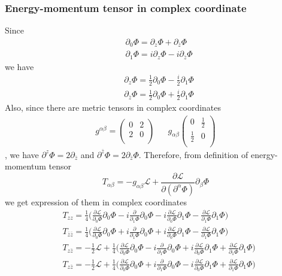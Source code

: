 \documentclass[11pt,a4paper]{article}
\theoremstyle{definition}
\begin{document}
	\subsubsection{Energy-momentum tensor in complex coordinate}
	Since 
	\[
	\begin{aligned}
	&\partial_0 \Phi = \partial_z \Phi + \partial_{\bar{z}}\Phi\\&\partial_1 \Phi = i\partial_z \Phi - i \partial_{\bar{z}}\Phi
	\end{aligned}
	\]
	we have \[
	\begin{aligned}
	&\partial_z \Phi =\frac{1}{2} \partial_0 \Phi - \frac{i}{2} \partial_1 \Phi\\& \partial_{\bar{z}} \Phi = \frac{1}{2} \partial_0 \Phi+ \frac{i}{2} \partial_1 \Phi
	\end{aligned}
	\] 
	Also, since there are metric tensors in complex coordinates
	\[
	\begin{aligned}
	g^{\alpha \beta}= \begin{pmatrix}
	0&2 \\
	2&0\\
	\end{pmatrix}& &g_{\alpha \beta}\begin{pmatrix}
	0& \frac{1}{2}\\
	\frac{1}{2}& 0\\
	\end{pmatrix}
	\end{aligned}
	\],
	we have $\partial^z \Phi = 2 \partial_{\bar{z}}$ and $\partial^{\bar{z}} \Phi = 2\partial_{\bar{z}} \Phi$. Therefore, from definition of energy-momentum tensor
	\[T_{\alpha \beta}= - g_{\alpha \beta} \mathcal{L}+ \frac{\partial \mathcal{L}}{\partial (\partial^\alpha \Phi)} \partial_\beta \Phi
	\] we get expression of them in complex coordinates
	\[
	\begin{aligned}
	&T_{zz} = \frac{1}{4}\big( \frac{\partial \mathcal{L}}{\partial_0 \Phi} \partial_0 \Phi - i \frac{\partial}{\partial_1 \Phi} \partial_0 \Phi - i \frac{\partial \mathcal{L}}{\partial_0 \Phi} \partial_1 \Phi - \frac{\partial \mathcal{L}}{\partial_1 \Phi} \partial_1 \Phi\big)\\
	&T_{\bar{z}\bar{z}} = \frac{1}{4}\big( \frac{\partial \mathcal{L}}{\partial_0 \Phi} \partial_0 \Phi + i \frac{\partial}{\partial_1 \Phi} \partial_0 \Phi + i \frac{\partial \mathcal{L}}{\partial_0 \Phi} \partial_1 \Phi - \frac{\partial \mathcal{L}}{\partial_1 \Phi} \partial_1 \Phi \big)\\
	&T_{z \bar{z}} = - \frac{1}{2} \mathcal{L} + \frac{1}{4} \big( \frac{\partial \mathcal{L}}{\partial_0 \Phi} \partial_0 \Phi - i \frac{\partial}{\partial_1 \Phi} \partial_0 \Phi + i \frac{\partial \mathcal{L}}{\partial_0 \Phi} \partial_1 \Phi + \frac{\partial \mathcal{L}}{\partial_1 \Phi} \partial_1 \Phi\big)\\
	&T_{z \bar{z}} = - \frac{1}{2} \mathcal{L} + \frac{1}{4} \big( \frac{\partial \mathcal{L}}{\partial_0 \Phi} \partial_0 \Phi + i \frac{\partial}{\partial_1 \Phi} \partial_0 \Phi - i \frac{\partial \mathcal{L}}{\partial_0 \Phi} \partial_1 \Phi + \frac{\partial \mathcal{L}}{\partial_1 \Phi} \partial_1 \Phi\big)\\
	\end{aligned}
	\]
\end{document}
